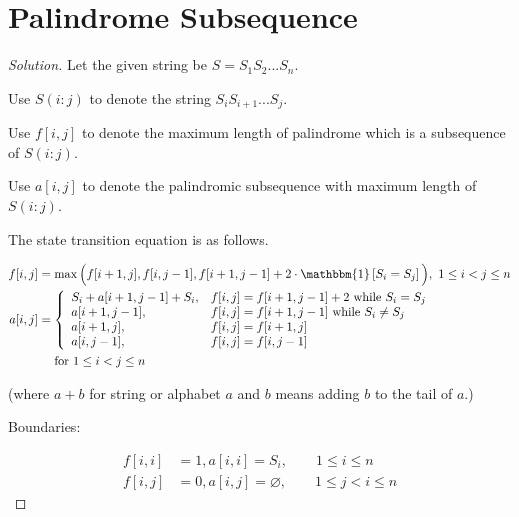 \documentclass{article}
\newenvironment{solution}{\begin{proof}[\noindent\it Solution]}{\end{proof}}
\begin{document}
\section{Palindrome Subsequence}
\vspace{1em}
\begin{solution}
    Let the given string be $S=S_1S_2...S_n$.
    
    \hspace{2.6em}
    Use $S(i:j)$ to denote the string $S_iS_{i+1}...S_j$.

    \hspace{2.6em}
    Use $f[i,j]$ to denote the maximum length of palindrome which is a subsequence of $S(i:j)$. 
    
    \hspace{2.6em}
    Use $a[i,j]$ to denote the palindromic subsequence with maximum length of $S(i:j)$.
    
    \vspace{1em} \hspace{2.6em}
    The state transition equation is as follows.
    
    \vspace{-2em}
    \begin{align*}
        f[i,j] &= \max\Big(f[i+1,j],f[i,j-1],f[i+1,j-1]+2\cdot\mathbbm{1}\left[S_i=S_j\right]\Big),\ 1\le i<j\le n \\
        a[i,j]& =\left\{\begin{array}{ll}
            S_i+a[i+1,j-1]+S_i, & f[i,j]=f[i+1,j-1]+2\text{ while }  S_i=S_j \\
            a[i+1,j-1], & f[i,j]=f[i+1,j-1]\text{ while } S_i\neq S_j \\
            a[i+1,j], & f[i,j]=f[i+1,j]\\
            a[i,j-1], & f[i,j]=f[i,j-1]
        \end{array}\right.\\
        &\quad\ \text{for }1\le i<j\le n\\
    \end{align*}
    
    \vspace{-3.6em} \hspace{9em}
    (where $a+b$ for string or alphabet $a$ and $b$ means adding $b$ to the tail of $a$.)
    
    \vspace{1.3em} \hspace{2.6em}
    Boundaries:
    
    \vspace{-3em}
    \begin{align*}
        f[i,i] &= 1, a[i,i]=S_i, \qquad 1\le i\le n\\
        f[i,j] &= 0, a[i,j]=\varnothing, \qquad 1\le j<i\le n
    \end{align*}
    

\end{solution}
\end{document}
